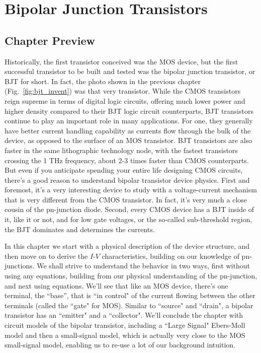 
\chapter{Bipolar Junction Transistors}

\graphicspath{{./figs_bjt/}}




\section{Chapter Preview}

Historically, the first transistor conceived was the MOS device, but the first successful transistor to be built and tested was the bipolar junction transistor, or BJT for short.  In fact, the photo shown in the previous chapter (Fig.~\ref{fig:bjt_invent}) was that very transistor.  While the CMOS transistors reign supreme in terms of digital logic circuits, offering much lower power and higher density compared to their BJT logic circuit counterparts, BJT transistors continue to play an important role in many applications.  For one, they generally have better current handling capability as currents flow through the bulk of the device, as opposed to the surface of an MOS transistor.  BJT transistors are also faster in the same lithographic technology node, with the fastest transistors crossing the 1 THz frequency, about 2-3 times faster than CMOS counterparts.  But even if you anticipate spending your entire life designing CMOS circuits, there's a good reason to understand bipolar transistor device physics.  First and foremost, it's a very interesting device to study with a voltage-current mechanism that is very different from the CMOS transistor.  In fact, it's very much a close cousin of the pn-junction diode.  Second, every CMOS device has a BJT inside of it, like it or not, and for low gate voltages, or the so-called sub-threshold region, the BJT dominates and determines the currents.  

In this chapter we start with a physical description of the device structure, and then move on to derive the $I$-$V$ characteristics, building on our knowledge of pn-junctions. We shall strive to understand the behavior in two ways, first without using any equations, building from our physical understanding of the pn-junction, and next using equations.  We'll see that like an MOS device, there's one terminal, the ``base'', that is ``in control" of the current flowing between the other terminals (called the ``gate" for MOS).  Similar to ``source" and ``drain", a bipolar transistor has an ``emitter" and a ``collector".   We'll conclude the chapter with circuit models of the bipolar transistor, including a ``Large Signal" Ebers-Moll model and then a small-signal model, which is actually very close to the MOS small-signal model, enabling us to re-use a lot of our background intuition.

